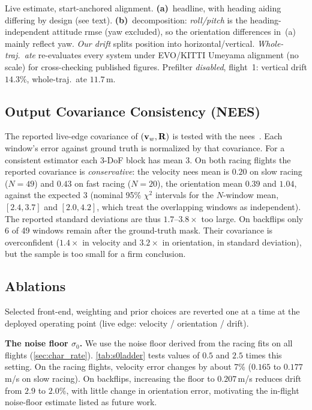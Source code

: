 \begin{table}[t]
\vspace{2pt}

\parbox{\columnwidth}{\raggedright\scriptsize Live estimate, start-anchored
  alignment.  \textbf{(a)}~headline, with heading aiding differing by design (see
  text).  \textbf{(b)}~decomposition: \emph{roll/pitch} is the
  heading-independent attitude \ac{rmse} (yaw excluded), so the orientation differences in~(a) mainly reflect yaw.  \emph{Our drift} splits position into
  horizontal/vertical.  \emph{Whole-traj.\ \ac{ate}} re-evaluates every
  system under EVO/KITTI Umeyama alignment (no scale) for cross-checking
  published figures.  Prefilter \emph{disabled}, flight~1: vertical
  drift $14.3\%$, whole-traj.\ \ac{ate} $11.7$\,m.\par}
\end{table}

\subsection{Output Covariance Consistency (NEES)}
\label{sec:nees}
The reported live-edge covariance of $(\mathbf{v}_w, \mathbf{R})$ is tested with the
\ac{nees}~\cite{barshalom2001estimation}.  Each window's error against
ground truth is normalized by that covariance.  For a consistent
estimator each 3-DoF block has mean 3.  On both racing
flights the reported covariance is \emph{conservative}: the velocity
\ac{nees} mean is $0.20$ on slow racing ($N{=}49$) and $0.43$ on fast
racing ($N{=}20$), the orientation mean $0.39$ and $1.04$, against
the expected 3 (nominal 95\% $\chi^2$ intervals for the $N$-window mean,
$[2.4,3.7]$ and $[2.0,4.2]$, which treat the overlapping windows as
independent).  The reported standard deviations are thus
$1.7$--$3.8\times$ too large.  On backflips only 6 of 49 windows
remain after the ground-truth mask.  Their covariance is overconfident
($1.4\times$ in velocity and $3.2\times$ in orientation, in standard
deviation), but the sample is too small for a firm conclusion.

\subsection{Ablations}
\label{sec:ablations}
Selected front-end, weighting and prior choices are reverted one at a
time at the deployed operating point (live edge: velocity /
orientation / drift).

\textbf{The noise floor $\sigma_0$.}  We use the noise floor derived
from the racing fits on all flights (\autoref{sec:char_rate}).
\autoref{tab:s0ladder} tests values of $0.5$ and $2.5$ times this
setting.  On the racing flights, velocity error changes by about 7\%
($0.165$ to $0.177$\,m/s on slow racing).  On backflips, increasing
the floor to $0.207$\,m/s reduces drift from $2.9$ to $2.0\%$, with
little change in orientation error, motivating the in-flight
noise-floor estimate listed as future work.

